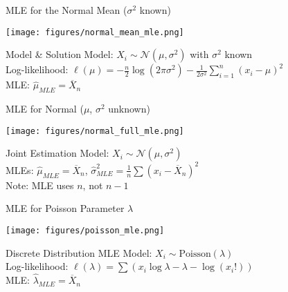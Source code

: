
\begin{frame}{MLE for the Normal Mean ($\sigma^2$ known)}
  \footnotesize
  \begin{center}
    \texttt{[image: figures/normal\_mean\_mle.png]}
  \end{center}
  \vspace{-0.5em}
  \begin{block}{Model \& Solution}
    \small
    Model: \(X_i \sim \mathcal{N}(\mu, \sigma^2)\) with \(\sigma^2\) known\\
    Log-likelihood: \(\ell(\mu) = -\tfrac{n}{2}\log(2\pi\sigma^2) - \tfrac{1}{2\sigma^2}\sum_{i=1}^n (x_i - \mu)^2\)\\
    MLE: \(\hat{\mu}_{MLE} = \overline{X}_n\)
  \end{block}
\end{frame}

\begin{frame}{MLE for Normal ($\mu$, $\sigma^2$ unknown)}
  \footnotesize
  \begin{center}
    \texttt{[image: figures/normal\_full\_mle.png]}
  \end{center}
  \vspace{-0.7em}
  \begin{block}{Joint Estimation}
    \footnotesize
    Model: \(X_i \sim \mathcal{N}(\mu, \sigma^2)\)\\
    MLEs: \(\hat{\mu}_{MLE} = \overline{X}_n\), \(\hat{\sigma}^2_{MLE} = \tfrac{1}{n}\sum (x_i - \overline{X}_n)^2\)\\
    Note: MLE uses \(n\), not \(n-1\)
  \end{block}
\end{frame}

\begin{frame}{MLE for Poisson Parameter $\lambda$}
  \footnotesize
  \begin{center}
    \texttt{[image: figures/poisson\_mle.png]}
  \end{center}
  \vspace{-0.5em}
  \begin{block}{Discrete Distribution MLE}
    \small
    Model: \(X_i \sim \text{Poisson}(\lambda)\)\\
    Log-likelihood: \(\ell(\lambda) = \sum (x_i \log \lambda - \lambda - \log(x_i!))\)\\
    MLE: \(\hat{\lambda}_{MLE} = \overline{X}_n\)
  \end{block}
\end{frame}

